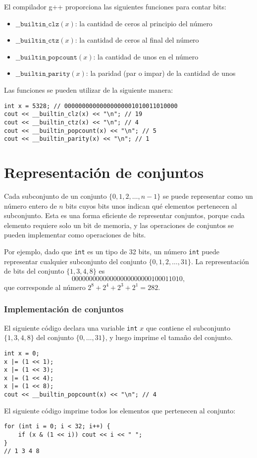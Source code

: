 El compilador g++ proporciona las siguientes
funciones para contar bits:

\begin{itemize}[itemsep=0em,topsep=0.5em]
    \item $\texttt{\_\_builtin\_clz}(x)$:
          la cantidad de ceros al principio del número
    \item $\texttt{\_\_builtin\_ctz}(x)$:
          la cantidad de ceros al final del número
    \item $\texttt{\_\_builtin\_popcount}(x)$:
          la cantidad de unos en el número
    \item $\texttt{\_\_builtin\_parity}(x)$:
          la paridad (par o impar) de la cantidad de unos
\end{itemize}

\noindent
Las funciones se pueden utilizar de la siguiente manera:
\begin{lstlisting}
int x = 5328; // 00000000000000000001010011010000
cout << __builtin_clz(x) << "\n"; // 19
cout << __builtin_ctz(x) << "\n"; // 4
cout << __builtin_popcount(x) << "\n"; // 5
cout << __builtin_parity(x) << "\n"; // 1
\end{lstlisting}

\section{Representación de conjuntos}

Cada subconjunto de un conjunto
$\{0,1,2,\ldots,n-1\}$
se puede representar como un número entero de $n$ bits
cuyos bits unos indican qué
elementos pertenecen al subconjunto.
Esta es una forma eficiente de representar conjuntos,
porque cada elemento requiere solo un bit de memoria,
y las operaciones de conjuntos se pueden implementar como operaciones de bits.

Por ejemplo, dado que \texttt{int} es un tipo de 32 bits,
un número \texttt{int} puede representar cualquier subconjunto
del conjunto $\{0,1,2,\ldots,31\}$.
La representación de bits del conjunto $\{1,3,4,8\}$ es
\[00000000000000000000000100011010,\]
que corresponde al número $2^8+2^4+2^3+2^1=282$.

\subsubsection{Implementación de conjuntos}

El siguiente código declara una variable \texttt{int}
$x$ que contiene el subconjunto $\{1,3,4,8\}$ del
conjunto $\{0,\ldots,31\}$, y luego imprime el tamaño del conjunto.
\begin{lstlisting}
int x = 0;
x |= (1 << 1);
x |= (1 << 3);
x |= (1 << 4);
x |= (1 << 8);
cout << __builtin_popcount(x) << "\n"; // 4
\end{lstlisting}
El siguiente código imprime todos
los elementos que pertenecen al conjunto:
\begin{lstlisting}
for (int i = 0; i < 32; i++) {
    if (x & (1 << i)) cout << i << " ";
}
// 1 3 4 8
\end{lstlisting}

